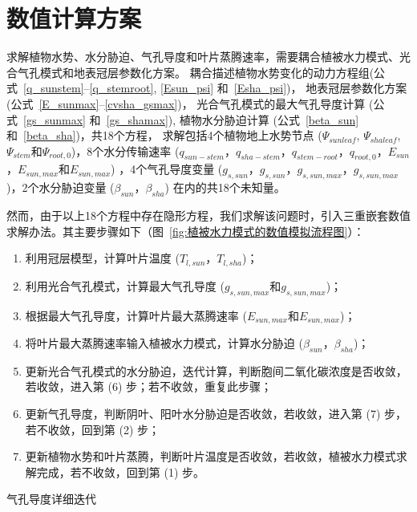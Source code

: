 \section{数值计算方案}\label{数值计算方案}
求解植物水势、水分胁迫、气孔导度和叶片蒸腾速率，需要耦合植被水力模式、光合气孔模式和地表冠层参数化方案。
耦合描述植物水势变化的动力方程组(公式~\eqref{q_sunstem}--\eqref{q_stemroot}, \eqref{Esun_psi} 和~\eqref{Esha_psi})，
地表冠层参数化方案 (公式~\eqref{E_sunmax}--\eqref{cvsha_gsmax})，
光合气孔模式的最大气孔导度计算 (公式~\eqref{gs_sunmax} 和~\eqref{gs_shamax}), 植物水分胁迫计算 (公式~\eqref{beta_sun} 和~\eqref{beta_sha})，共18个方程，
求解包括4个植物地上水势节点 ($\Psi_{sunleaf}$, $\Psi_{shaleaf}$, $\Psi_{stem}$和$\Psi_{root,0}$)，8个水分传输速率 
($q_{sun-stem}$，$q_{sha-stem}$，$q_{stem-root}$，$q_{root,0}$，$E_{sun}$，$E_{sun,max}$和$E_{sun,max}$) ，4个气孔导度变量
 ($g_{s,sun}$，$g_{s,sun}$，$g_{s,sun,max}$，$g_{s,sun,max}$)，2个水分胁迫变量 ($\beta_{sun}$，$\beta_{sha}$) 在内的共18个未知量。

然而，由于以上18个方程中存在隐形方程，我们求解该问题时，引入三重嵌套数值求解办法。其主要步骤如下（图~\ref{fig:植被水力模式的数值模拟流程图}）：
\begin{enumerate}
    \item 利用冠层模型，计算叶片温度 ($T_{l,sun}$，$T_{l,sha}$)；
    \item 利用光合气孔模式，计算最大气孔导度 ($g_{s,sun,max}$和$g_{s,sun,max}$)；
    \item 根据最大气孔导度，计算叶片最大蒸腾速率 ($E_{sun,max}$和$E_{sun,max}$)；
    \item 将叶片最大蒸腾速率输入植被水力模式，计算水分胁迫 ($\beta_{sun}$，$\beta_{sha}$)；
    \item 更新光合气孔模式的水分胁迫，迭代计算，判断胞间二氧化碳浓度是否收敛，若收敛，进入第 (6) 步；若不收敛，重复此步骤；
    \item 更新气孔导度，判断阴叶、阳叶水分胁迫是否收敛，若收敛，进入第 (7) 步，若不收敛，回到第 (2) 步；
    \item 更新植物水势和叶片蒸腾，判断叶片温度是否收敛，若收敛，植被水力模式求解完成，若不收敛，回到第 (1) 步。
\end{enumerate}

气孔导度详细迭代

